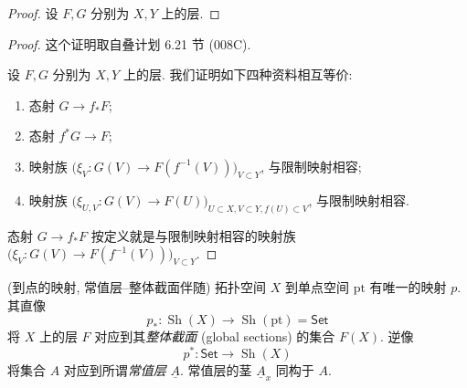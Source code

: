 \begin{proof}
	设 $F,G$ 分别为 $X,Y$ 上的层.
%		
\end{proof}

\begin{proof}
	这个证明取自叠计划 \cite{stacks-project} 6.21 节 (008C).
	
	设 $F,G$ 分别为 $X,Y$ 上的层. 我们证明如下四种资料相互等价:
	\begin{enumerate}[(1)]
		\item 态射 $G \to f_*F$;
		\item 态射 $f^* G \to F$;
		\item 映射族 $\big(\xi_V \colon G(V) \to F(f^{-1}(V))\big)_{V\subset Y}$, 与限制映射相容;
		\item 映射族 $\big(\xi_{U,V}\colon G(V) \to F(U)\big)_{U\subset X, V \subset Y, f(U)\subset V}$, 与限制映射相容.
	\end{enumerate}

	态射 $G \to f_* F$ 按定义就是与限制映射相容的映射族 $\big(\xi_V \colon G(V) \to F(f^{-1}(V))\big)_{V\subset Y}$.
\end{proof}

\begin{example}
    [label={global-sections}]
    {(到点的映射, 常值层--整体截面伴随)}
    拓扑空间 $X$ 到单点空间 $\text{pt}$ 有唯一的映射 $p$.
    其直像
    $$
    p_* \colon \operatorname{Sh}(X) \to \operatorname{Sh}(\text{pt}) = \mathsf {Set} 
    $$
    将 $X$ 上的层 $F$ 对应到其\emph{整体截面} (global sections) 的集合 $F(X)$.
    逆像
    $$
    p^* \colon \mathsf {Set} \to \operatorname{Sh}(X)
    $$
    将集合 $A$ 对应到所谓\emph{常值层} $\underline{A}$.
    常值层的茎 ${\underline{A}}_x$ 同构于 $A$.
\end{example}

